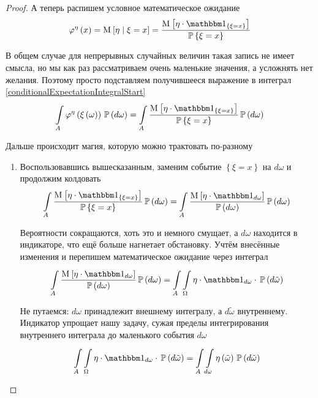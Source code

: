 \begin{proof}
А теперь распишем условное математическое ожидание
$$\varphi^{\eta}\left( x \right)
    = \Mean{\eta \mid \xi = x}
    = \frac{\Mean{\eta \cdot \Indicatorof{\xi = x}}}{\Probability{\xi = x}}$$

В общем случае для непрерывных случайных величин такая запись не имеет смысла,
но мы как раз рассматриваем очень маленькие значения,
а усложнять нет желания.
Поэтому просто подставляем получившееся выражение
в интеграл \eqref{conditionalExpectationIntegralStart}
\begin{equation}\label{conditionalExpectationMagic}
    \integrall{A}{\probability{d\omega}}{
        \varphi^{\eta}\left( \xi\left( \omega \right) \right)}
        = \integrall{A}{\probability{d\omega}}{
            \frac{\Mean{\eta \cdot \Indicatorof{\xi=x}}}{\Probability{\xi = x}}}
\end{equation}


Дальше происходит магия, которую можно трактовать по-разному
\begin{enumerate}[label=\bfseries Формулировка \arabic*:]
    \item
        Воспользовавшись вышесказанным,
        заменим событие $\left\{ \xi = x \right\}$
        на $d\omega$ и продолжим колдовать
        $$\integrall{A}{\probability{d\omega}}{
            \frac{\Mean{\eta \cdot \Indicatorof{\xi = x}}}
                {\Probability{\xi = x}}}
            = \integrall{A}{\probability{d\omega}}{
                \frac{\Mean{ \eta \cdot \indicatorof{d\omega} }}
                    {\probability{d\omega}}}$$

        Вероятности сокращаются, хоть это и немного смущает,
        а $d\omega$ находится в индикаторе, что ещё больше нагнетает обстановку.
        Учтём внесённые изменения и перепишем
        математическое ожидание через интеграл
        $$\integrall{A}{\probability{d\omega}}{
            \frac{\Mean{ \eta \cdot \indicatorof{d\omega} }}
                {\probability{d\omega}}}
            = \int\limits_A \integrall{\Omega}{\probability{d\tilde{\omega}}}{
                \eta \cdot \indicatorof{d\omega} \cdot}$$

        Не путаемся: $d\omega$ принадлежит внешнему интегралу,
        а $d\tilde{\omega}$ внутреннему.
        Индикатор упрощает нашу задачу,
        сужая пределы интегрирования внутреннего интеграла
        до маленького события $d\omega$
        $$\int\limits_A \integrall{\Omega}{\probability{d\tilde{\omega}}}{
                \eta \cdot \indicatorof{d\omega} \cdot}
                = \int\limits_A \integrall{d\omega}
                    {\probability{d\tilde{\omega}}}
                    {\eta\left( \tilde{\omega}\right)}$$


\end{enumerate}
\end{proof}
